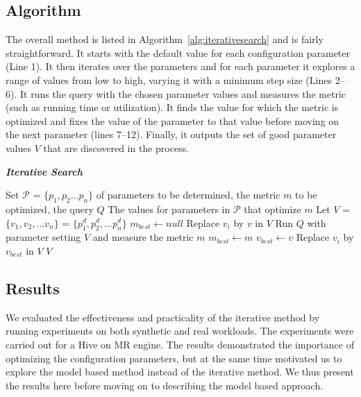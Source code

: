 \subsection{Algorithm}
The overall method is listed in Algorithm~\ref{alg:iterativesearch} and is fairly straightforward. It starts with the default value for each configuration parameter (Line 1). It then iterates over the parameters and for each parameter it explores a range of values from low to high, varying it with a minimum step size (Lines 2--6). It runs the query with the chosen parameter values and measures the metric (such as running time or utilization). It finds the value for which the metric is optimized and fixes the value of the parameter to that value before moving on the next parameter (lines 7--12). Finally, it outputs the set of good parameter values $V$ that are discovered in the process.
\renewcommand{\algorithmicrequire}{\textbf{Input:}}
\renewcommand{\algorithmicensure}{\textbf{Output:}}
\renewcommand{\algorithmiccomment}[1]{// #1}
\begin{algorithm}[h]
	\caption{\bf \textit{Iterative Search}}
	\label{alg:iterativesearch}
	\begin{algorithmic}[1]
		\footnotesize
		\REQUIRE Set $\mathcal{P}$ = $\{p_1, p_2 \ldots p_n\}$ of parameters to be determined, the metric $m$ to be optimized, the query $Q$
		\ENSURE The values for parameters in $\mathcal{P}$ that optimize $m$
		\STATE Let $V$ = $\{v_1, v_2, \ldots v_n\}$ = $\{p_1^d, p_2^d, \ldots p_n^d\}$
			\STATE $m_{best} \gets null$
				\STATE Replace $v_i$ by $v$ in $V$
				\STATE Run $Q$ with parameter setting $V$ and measure the metric $m$
					\STATE $m_{best} \gets m$
					\STATE $v_{best} \gets v$
				\ENDIF
			\ENDFOR
			\STATE Replace $v_i$ by $v_{best}$ in $V$ 			
		\ENDFOR
		\RETURN $V$
    \end{algorithmic}
\end{algorithm}
  
\subsection{Results}
We evaluated the effectiveness and practicality of the iterative method by running experiments on both synthetic and real workloads. The experiments were carried out for a Hive on MR engine. The results demonstrated the importance of optimizing the configuration parameters, but at the same time motivated us to explore the model based method instead of the iterative method. We thus present the results here before moving on to describing the model based approach.

